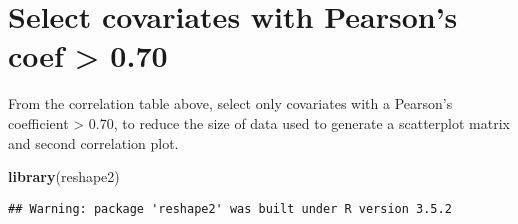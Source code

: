 \documentclass[]{article}
\newenvironment{Shaded}{\begin{snugshade}}{\end{snugshade}}
\newcommand{\KeywordTok}[1]{\textcolor[rgb]{0.13,0.29,0.53}{\textbf{#1}}}
\newcommand{\DecValTok}[1]{\textcolor[rgb]{0.00,0.00,0.81}{#1}}
\newcommand{\StringTok}[1]{\textcolor[rgb]{0.31,0.60,0.02}{#1}}
\newcommand{\OperatorTok}[1]{\textcolor[rgb]{0.81,0.36,0.00}{\textbf{#1}}}
\newcommand{\NormalTok}[1]{#1}
\begin{document}
\section{Select covariates with Pearson's coef \textgreater{}
0.70}\label{select-covariates-with-pearsons-coef-0.70}

From the correlation table above, select only covariates with a
Pearson's coefficient \textgreater{} 0.70, to reduce the size of data
used to generate a scatterplot matrix and second correlation plot.

\begin{Shaded}
\begin{Highlighting}[]
\KeywordTok{library}\NormalTok{(reshape2)}
\end{Highlighting}
\end{Shaded}

\begin{verbatim}
## Warning: package 'reshape2' was built under R version 3.5.2
\end{verbatim}

\begin{Shaded}
\end{Shaded}
\end{document}
